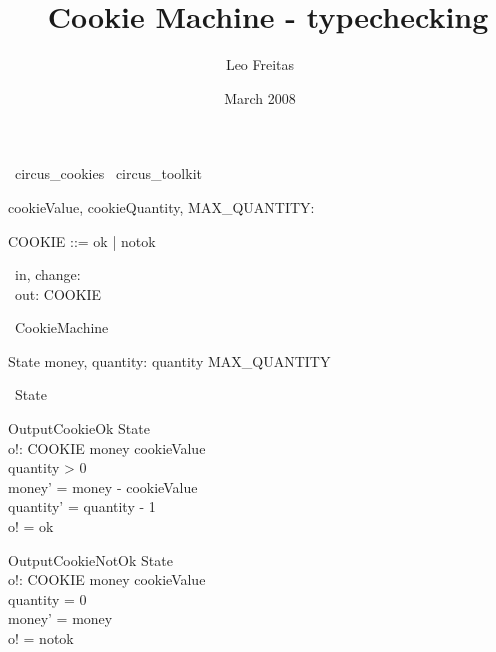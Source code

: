 \documentclass{article}
\begin{document}
\title{\Circus\ Cookie Machine - typechecking}
\author{Leo Freitas}
\date{March 2008}

\maketitle

\begin{zsection}
  \SECTION\ circus\_cookies \parents\ circus\_toolkit
\end{zsection}

\begin{axdef}
   cookieValue, cookieQuantity, MAX\_QUANTITY: \nat
\end{axdef}

\begin{zed}
   COOKIE ::= ok | notok
\end{zed}

\begin{circus}
   \circchannel\ in, change: \nat \\
   \circchannel\ out: COOKIE
\end{circus}

\begin{circus}
   \circprocess\ CookieMachine \circdef \circbegin
\end{circus}

\begin{schema}{State}
   money, quantity: \nat
\where
   quantity \leq MAX\_QUANTITY
\end{schema}

\begin{circusaction}
   \circstate\ State
\end{circusaction}

\begin{schema}{OutputCookieOk}
   \Delta State \\
   o!: COOKIE
\where
   money \geq cookieValue \\
   quantity > 0 \\
   money' = money - cookieValue \\
   quantity' = quantity - 1 \\
   o! = ok
\end{schema}

\begin{schema}{OutputCookieNotOk}
   \Delta State \\
   o!: COOKIE
\where
   money \geq cookieValue \\
   quantity = 0 \\
   money' = money \\
   o! = notok
\end{schema}
\end{document}
